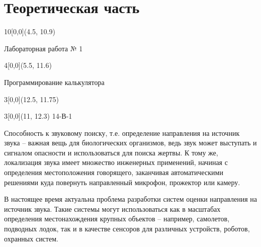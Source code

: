 \newcommand{\placetextbox}[3]{%
	\setbox0=\hbox{#3}%
	\AddToShipoutPictureFG*{%
		\put(\LenToUnit{#1\paperwidth},\LenToUnit{#2\paperheight}){\vtop{{\null}\makebox[0pt][c]{#3}}}%
	}%
}%

\fancyhf{}                          %

\chapter{Теоретическая часть}						


\begin{textblock}{10}[0,0](4.5, 10.9)
	\begin{center}
		\Large	Лабораторная работа № 1\\
	\end{center}
\end{textblock}

\begin{textblock}{4}[0,0](5.5, 11.6)
\begin{center}
\Large	Программирование калькулятора\\
\end{center}
\end{textblock}

\begin{textblock}{3}[0,0](12.5, 11.75)
	\pageref{LastPage}
\end{textblock}

\begin{textblock}{3}[0,0](11, 12.3)
	14-В-1
\end{textblock}
	
	
Способность к звуковому поиску, т.е. определение направления на источник звука – важная вещь для биологических организмов, ведь звук может выступать и сигналом опасности и использоваться для поиска жертвы. К  тому же, локализация звука имеет множество инженерных применений, начиная с определения местоположения говорящего, заканчивая автоматическими решениями куда повернуть направленный микрофон, прожектор или камеру.

В настоящее время актуальна проблема разработки систем оценки направления на источник звука. Такие системы могут использоваться как в масштабах определения местонахождения крупных объектов – например, самолетов, подводных лодок, так и в качестве сенсоров для различных устройств, роботов, охранных систем. 

